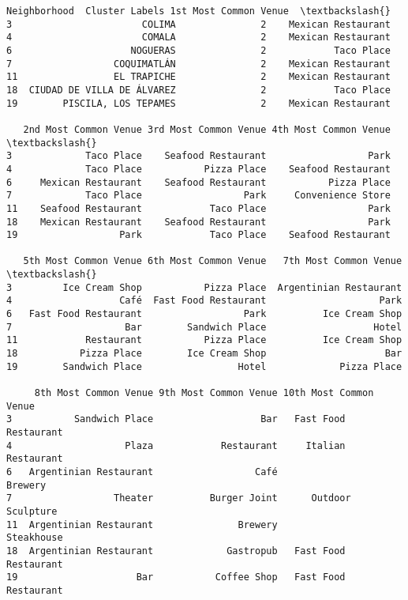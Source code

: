 \documentclass[11pt]{article}
\makeatletter
\newcommand{\boxspacing}{\kern\kvtcb@left@rule\kern\kvtcb@boxsep}
\newcommand{\prompt}[4]{
        \ttfamily\llap{{\color{#2}[#3]:\hspace{3pt}#4}}\vspace{-\baselineskip}
    }
\makeatother
\begin{document}
            \begin{tcolorbox}[breakable, size=fbox, boxrule=.5pt, pad at break*=1mm, opacityfill=0]
\prompt{Out}{outcolor}{49}{\boxspacing}
\begin{Verbatim}[commandchars=\\\{\}]
                  Neighborhood  Cluster Labels 1st Most Common Venue  \textbackslash{}
3                       COLIMA               2    Mexican Restaurant
4                       COMALA               2    Mexican Restaurant
6                     NOGUERAS               2            Taco Place
7                  COQUIMATLÁN               2    Mexican Restaurant
11                 EL TRAPICHE               2    Mexican Restaurant
18  CIUDAD DE VILLA DE ÁLVAREZ               2            Taco Place
19        PISCILA, LOS TEPAMES               2    Mexican Restaurant

   2nd Most Common Venue 3rd Most Common Venue 4th Most Common Venue  \textbackslash{}
3             Taco Place    Seafood Restaurant                  Park
4             Taco Place           Pizza Place    Seafood Restaurant
6     Mexican Restaurant    Seafood Restaurant           Pizza Place
7             Taco Place                  Park     Convenience Store
11    Seafood Restaurant            Taco Place                  Park
18    Mexican Restaurant    Seafood Restaurant                  Park
19                  Park            Taco Place    Seafood Restaurant

   5th Most Common Venue 6th Most Common Venue   7th Most Common Venue  \textbackslash{}
3         Ice Cream Shop           Pizza Place  Argentinian Restaurant
4                   Café  Fast Food Restaurant                    Park
6   Fast Food Restaurant                  Park          Ice Cream Shop
7                    Bar        Sandwich Place                   Hotel
11            Restaurant           Pizza Place          Ice Cream Shop
18           Pizza Place        Ice Cream Shop                     Bar
19        Sandwich Place                 Hotel             Pizza Place

     8th Most Common Venue 9th Most Common Venue 10th Most Common Venue
3           Sandwich Place                   Bar   Fast Food Restaurant
4                    Plaza            Restaurant     Italian Restaurant
6   Argentinian Restaurant                  Café                Brewery
7                  Theater          Burger Joint      Outdoor Sculpture
11  Argentinian Restaurant               Brewery             Steakhouse
18  Argentinian Restaurant             Gastropub   Fast Food Restaurant
19                     Bar           Coffee Shop   Fast Food Restaurant
\end{Verbatim}
\end{tcolorbox}
        
\end{document}

